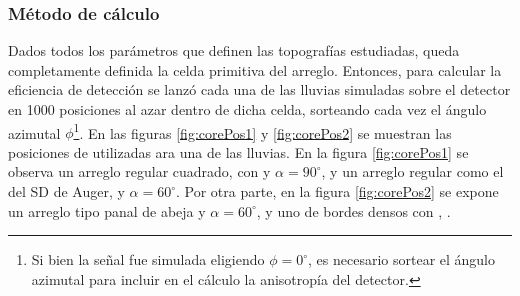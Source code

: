 	
	
	\subsubsection{M\'etodo de c\'alculo}
	
	Dados todos los par\'ametros que definen las topograf\'ias estudiadas, queda completamente definida la celda primitiva del arreglo.
	Entonces, para calcular la eficiencia de detecci\'on se lanz\'o cada una de las lluvias simuladas sobre el detector en 1000 posiciones al azar dentro de dicha celda, sorteando cada vez el \'angulo azimutal $\phi$\footnote{Si bien la se\~nal fue simulada eligiendo $\phi=0^\circ$, es necesario sortear el \'angulo azimutal para incluir en el c\'alculo la anisotrop\'ia del detector.}.
	En las figuras \ref{fig:corePos1} y \ref{fig:corePos2} se muestran las posiciones de utilizadas ara una de las lluvias.
	En la figura \ref{fig:corePos1} se observa un arreglo regular cuadrado, con  y $\alpha=90^\circ$, y un arreglo regular como el del SD de Auger, y $\alpha=60^\circ$.
	Por otra parte, en la figura \ref{fig:corePos2} se expone un arreglo tipo panal de abeja  y $\alpha=60^\circ$, y uno de bordes densos con , .
	
